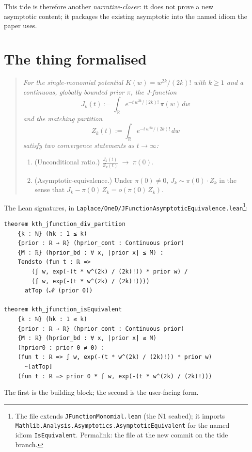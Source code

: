 \documentclass[11pt]{article}
\begin{document}
This tide is therefore another \emph{narrative-closer}: it does not
prove a new asymptotic content; it packages the existing asymptotic
into the named idiom the paper uses.

\section{The thing formalised}

\begin{quote}\itshape
For the single-monomial potential $K(w) = w^{2k}/(2k)!$ with $k \geq
1$ and a continuous, globally bounded prior $\pi$, the J-function
\[
  J_k(t) := \int_{\mathbb{R}} e^{-t\,w^{2k}/(2k)!}\,\pi(w)\,dw
\]
and the matching partition
\[
  Z_k(t) := \int_{\mathbb{R}} e^{-t\,w^{2k}/(2k)!}\,dw
\]
satisfy two convergence statements as $t \to \infty$:
\begin{enumerate}[leftmargin=*]
\item (Unconditional ratio.) $\displaystyle \frac{J_k(t)}{Z_k(t)} \;\longrightarrow\; \pi(0)$.
\item (Asymptotic-equivalence.) Under $\pi(0) \neq 0$,
$J_k \sim \pi(0) \cdot Z_k$ in the sense that $J_k - \pi(0)\,Z_k = o(\pi(0)\,Z_k)$.
\end{enumerate}
\end{quote}

The Lean signatures, in
\texttt{Laplace/OneD/JFunctionAsymptoticEquivalence.lean}\footnote{The
file extends \texttt{JFunctionMonomial.lean} (the N1 seabed); it
imports \texttt{Mathlib.Analysis.Asymptotics.AsymptoticEquivalent} for
the named idiom \texttt{IsEquivalent}. Permalink: the file at the new
commit on the tide branch.}:

\begin{verbatim}
theorem kth_jfunction_div_partition
    {k : ℕ} (hk : 1 ≤ k)
    {prior : ℝ → ℝ} (hprior_cont : Continuous prior)
    {M : ℝ} (hprior_bd : ∀ x, |prior x| ≤ M) :
    Tendsto (fun t : ℝ =>
        (∫ w, exp(-(t * w^(2k) / (2k)!)) * prior w) /
        (∫ w, exp(-(t * w^(2k) / (2k)!))))
      atTop (𝓝 (prior 0))

theorem kth_jfunction_isEquivalent
    {k : ℕ} (hk : 1 ≤ k)
    {prior : ℝ → ℝ} (hprior_cont : Continuous prior)
    {M : ℝ} (hprior_bd : ∀ x, |prior x| ≤ M)
    (hprior0 : prior 0 ≠ 0) :
    (fun t : ℝ => ∫ w, exp(-(t * w^(2k) / (2k)!)) * prior w)
      ~[atTop]
    (fun t : ℝ => prior 0 * ∫ w, exp(-(t * w^(2k) / (2k)!)))
\end{verbatim}

The first is the building block; the second is the user-facing form.
\end{document}

